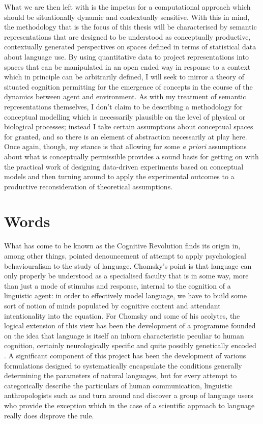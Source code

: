 What we are then left with is the impetus for a computational approach which should be situationally dynamic and contextually sensitive.  With this in mind, the methodology that is the focus of this thesis will be characterised by semantic representations that are designed to be understood as conceptually productive, contextually generated perspectives on spaces defined in terms of statistical data about language use.  By using quantitative data to project representations into spaces that can be manipulated in an open ended way in response to a context which in principle can be arbitrarily defined, I will seek to mirror a theory of situated cognition permitting for the emergence of concepts in the course of the dynamics between agent and environment.  As with my treatment of semantic representations themselves, I don't claim to be describing a methodology for conceptual modelling which is necessarily plausible on the level of physical or biological processes; instead I take certain assumptions about conceptual spaces for granted, and so there is an element of abstraction necessarily at play here.  Once again, though, my stance is that allowing for some \emph{a priori} assumptions about what is conceptually permissible provides a sound basis for getting on with the practical work of designing data-driven experiments based on conceptual models and then turning around to apply the experimental outcomes to a productive reconsideration of theoretical assumptions.

\section{Words} \label{sec:words}
What has come to be known as the Cognitive Revolution finds its origin in, among other things,  pointed denouncement of  attempt to apply psychological behaviouralism to the study of language.  Chomsky's point is that language can only properly be understood as a specialised faculty that is in some way, more than just a mode of stimulus and response, internal to the cognition of a linguistic agent: in order to effectively model language, we have to build some sort of notion of minds populated by cognitive content and attendant intentionality into the equation.  For Chomsky and some of his acolytes, the logical extension of this view has been the development of a programme founded on the idea that language is itself an inborn characteristic peculiar to human cognition, certainly neurologically specific and quite possibly genetically encoded \citep{Chomsky1986, Pinker1994, Fodor2001}.  A significant component of this project has been the development of various formulations designed to systematically encapsulate the conditions generally determining the parameters of natural languages, but for every attempt to categorically describe the particulars of human communication, linguistic anthropologists such as \cite{Levinson2001} and \cite{Everett2005} turn around and discover a group of language users who provide the exception which in the case of a scientific approach to language really does disprove the rule.

